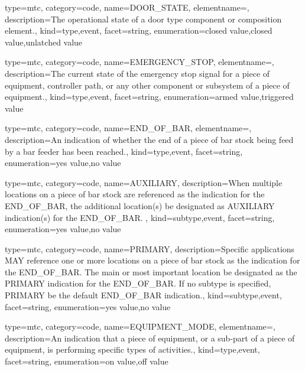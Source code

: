 {
  type=mtc,
  category=code,
  name={DOOR\_STATE},
  elementname=,
  description={The operational state of a \gls{door} type component or composition element.},
  kind={type,event},
  facet={\gls{string}},
  enumeration={\gls{closed value},\gls{closed value},\gls{unlatched value}}
}


{
  type=mtc,
  category=code,
  name={EMERGENCY\_STOP},
  elementname=,
  description={The current state of the emergency stop signal for a piece of equipment, controller path, or any other component or subsystem of a piece of equipment.},
  kind={type,event},
  facet={\gls{string}},
  enumeration={\gls{armed value},\gls{triggered value}}
}


{
  type=mtc,
  category=code,
  name={END\_OF\_BAR},
  elementname=,
  description={An indication of whether the end of a piece of bar stock being feed by a bar feeder has been reached.},
  kind={type,event},
  facet={\gls{string}},
  enumeration={\gls{yes value},\gls{no value}}
}


{
  type=mtc,
  category=code,
  name={AUXILIARY},
  description={When multiple locations on a piece of bar stock are referenced as the indication for the END\_OF\_BAR, the additional location(s) \must be designated as AUXILIARY indication(s) for the END\_OF\_BAR.  },
  kind={subtype,event},
  facet={\gls{string}},
  enumeration={\gls{yes value},\gls{no value}}
}


{
  type=mtc,
  category=code,
  name={PRIMARY},
  description={Specific applications MAY reference one or more locations on a piece of bar stock as the indication for the END\_OF\_BAR.  The main or most important location \must be designated as the PRIMARY indication for the END\_OF\_BAR.   \newline If no \gls{subtype} is specified, PRIMARY \must be the default END\_OF\_BAR indication.},
  kind={subtype,event},
  facet={\gls{string}},
  enumeration={\gls{yes value},\gls{no value}}
}


{
  type=mtc,
  category=code,
  name={EQUIPMENT\_MODE},
  elementname=,
  description={An indication that a piece of equipment, or a sub-part of a piece of equipment, is performing specific types of activities.},
  kind={type,event},
  facet={\gls{string}},
  enumeration={\gls{on value},\gls{off value}}
}


